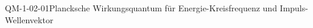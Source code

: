 
\begin{CONC}{QM-1-02-01}{Plancksche Wirkungsquantum für Energie-Kreisfrequenz und Impuls-Wellenvektor}
\end{CONC}
